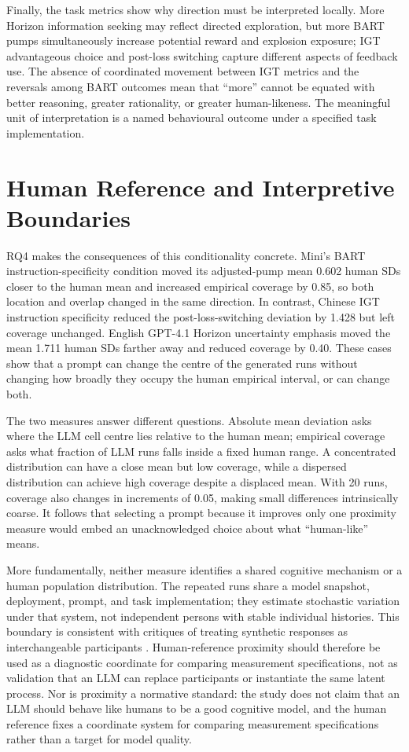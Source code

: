 \documentclass[logo,msc,inf]{infthesis}       %
\begin{document}
Finally, the task metrics show why direction must be interpreted locally. More Horizon information seeking may reflect directed exploration, but more BART pumps simultaneously increase potential reward and explosion exposure; IGT advantageous choice and post-loss switching capture different aspects of feedback use. The absence of coordinated movement between IGT metrics and the reversals among BART outcomes mean that ``more'' cannot be equated with better reasoning, greater rationality, or greater human-likeness. The meaningful unit of interpretation is a named behavioural outcome under a specified task implementation.

\section{Human Reference and Interpretive Boundaries}

RQ4 makes the consequences of this conditionality concrete. Mini's BART instruction-specificity condition moved its adjusted-pump mean 0.602 human SDs closer to the human mean and increased empirical coverage by 0.85, so both location and overlap changed in the same direction. In contrast, Chinese IGT instruction specificity reduced the post-loss-switching deviation by 1.428 but left coverage unchanged. English GPT-4.1 Horizon uncertainty emphasis moved the mean 1.711 human SDs farther away and reduced coverage by 0.40. These cases show that a prompt can change the centre of the generated runs without changing how broadly they occupy the human empirical interval, or can change both.

The two measures answer different questions. Absolute mean deviation asks where the LLM cell centre lies relative to the human mean; empirical coverage asks what fraction of LLM runs falls inside a fixed human range. A concentrated distribution can have a close mean but low coverage, while a dispersed distribution can achieve high coverage despite a displaced mean. With 20 runs, coverage also changes in increments of 0.05, making small differences intrinsically coarse. It follows that selecting a prompt because it improves only one proximity measure would embed an unacknowledged choice about what ``human-like'' means.

More fundamentally, neither measure identifies a shared cognitive mechanism or a human population distribution. The repeated runs share a model snapshot, deployment, prompt, and task implementation; they estimate stochastic variation under that system, not independent persons with stable individual histories. This boundary is consistent with critiques of treating synthetic responses as interchangeable participants \cite{Dillion2023ReplaceParticipants,Bisbee2024SyntheticSurveyData}. Human-reference proximity should therefore be used as a diagnostic coordinate for comparing measurement specifications, not as validation that an LLM can replace participants or instantiate the same latent process. Nor is proximity a normative standard: the study does not claim that an LLM should behave like humans to be a good cognitive model, and the human reference fixes a coordinate system for comparing measurement specifications rather than a target for model quality.
\end{document}
